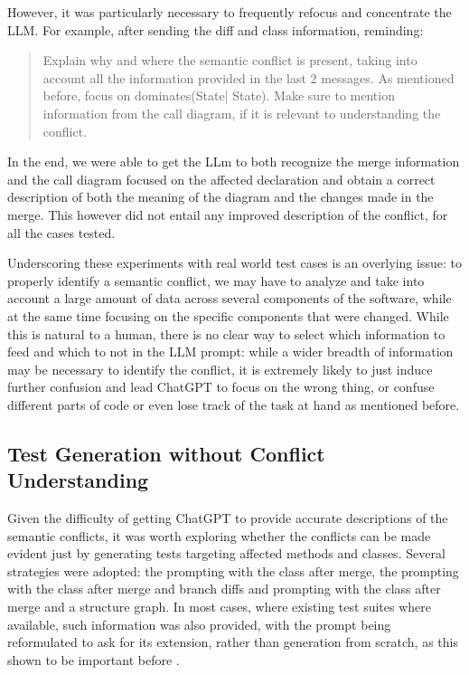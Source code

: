 However, it was particularly necessary to frequently refocus and concentrate the LLM. For example, after sending the diff and class information, reminding:

\begin{quote}
Explain why and where the semantic conflict is present, taking into account all the information provided in the last 2 messages. As mentioned before, focus on dominates(State| State). Make sure to mention information from the call diagram, if it is relevant to understanding the conflict.
\end{quote}

In the end, we were able to get the LLm to both recognize the merge information and the call diagram focused on the affected declaration and obtain a correct description of both the meaning of the diagram and the changes made in the merge. This however did not entail any improved description of the conflict, for all the cases tested.

Underscoring these experiments with real world test cases is an overlying issue: to properly identify a semantic conflict, we may have to analyze and take into account a large amount of data across several components of the software, while at the same time focusing on the specific components that were changed. While this is natural to a human, there is no clear way to select which information to feed and which to not in the LLM prompt: while a wider breadth of information may be necessary to identify the conflict, it is extremely likely to just induce further confusion and lead ChatGPT to focus on the wrong thing, or confuse different parts of code or even lose track of the task at hand as mentioned before.

\subsection{Test Generation without Conflict Understanding}

Given the difficulty of getting ChatGPT to provide accurate descriptions of the semantic conflicts, it was worth exploring whether the conflicts can be made evident just by generating tests targeting affected methods and classes. Several strategies were adopted: the prompting with the class after merge, the prompting with the class after merge and branch diffs and prompting with the class after merge and a structure graph. In most cases, where existing test suites where available, such information was also provided, with the prompt being reformulated to ask for its extension, rather than generation from scratch, as this shown to be important before \cite{kn:githubcopilot}.

